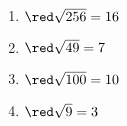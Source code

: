     \begin{enumerate}
        \item ${\red\sqrt{256}=16}$
        \item ${\red\sqrt{49}=7}$
        \item ${\red\sqrt{100}=10}$
        \item ${\red\sqrt{9}=3}$
    \end{enumerate}
